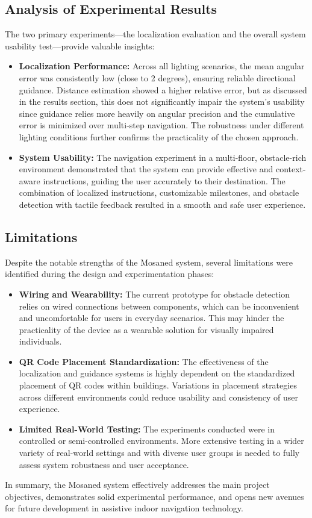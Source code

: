 \subsection{Analysis of Experimental Results}

The two primary experiments—the localization evaluation and the overall system usability test—provide valuable insights:

\begin{itemize}
	\item \textbf{Localization Performance:} Across all lighting scenarios, the mean angular error was consistently low (close to 2 degrees), ensuring reliable directional guidance. Distance estimation showed a higher relative error, but as discussed in the results section, this does not significantly impair the system’s usability since guidance relies more heavily on angular precision and the cumulative error is minimized over multi-step navigation. The robustness under different lighting conditions further confirms the practicality of the chosen approach.
	\item \textbf{System Usability:} The navigation experiment in a multi-floor, obstacle-rich environment demonstrated that the system can provide effective and context-aware instructions, guiding the user accurately to their destination. The combination of localized instructions, customizable milestones, and obstacle detection with tactile feedback resulted in a smooth and safe user experience.
\end{itemize}

\subsection{Limitations}

Despite the notable strengths of the Mosaned system, several limitations were identified during the design and experimentation phases:

\begin{itemize}
	\item \textbf{Wiring and Wearability:} The current prototype for obstacle detection relies on wired connections between components, which can be inconvenient and uncomfortable for users in everyday scenarios. This may hinder the practicality of the device as a wearable solution for visually impaired individuals.
	\item \textbf{QR Code Placement Standardization:} The effectiveness of the localization and guidance systems is highly dependent on the standardized placement of QR codes within buildings. Variations in placement strategies across different environments could reduce usability and consistency of user experience.

	\item \textbf{Limited Real-World Testing:} The experiments conducted were in controlled or semi-controlled environments. More extensive testing in a wider variety of real-world settings and with diverse user groups is needed to fully assess system robustness and user acceptance.
\end{itemize}


In summary, the Mosaned system effectively addresses the main project objectives, demonstrates solid experimental performance, and opens new avenues for future development in assistive indoor navigation technology.


